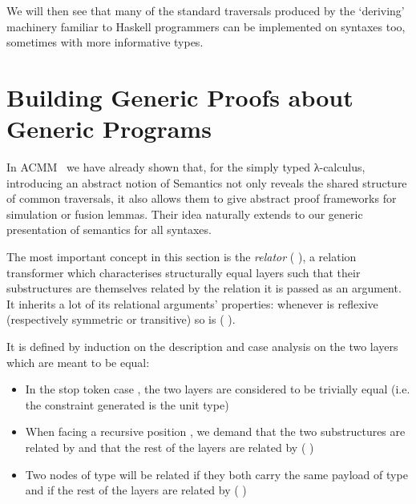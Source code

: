 We will then see that many of the standard traversals produced by the
`deriving' machinery familiar to Haskell programmers can be implemented
on syntaxes too, sometimes with more informative types.





\section{Building Generic Proofs about Generic Programs}

In ACMM~\citeyear{allais2017type} we have
already shown that, for the simply typed λ-calculus, introducing an abstract
notion of Semantics not only reveals the shared structure of common
traversals, it also allows them to give abstract proof frameworks for
simulation or fusion lemmas. Their idea naturally extends to our generic
presentation of semantics for all syntaxes.

The most important concept in this section is the \emph{relator} (  ),
a relation transformer which characterises structurally equal layers such that their
substructures are themselves related by the relation it is passed as an
argument. It inherits a lot of its relational arguments' properties: whenever
 is reflexive (respectively symmetric or transitive) so is {(   )}.\label{lem:zipstable}

It is defined by induction on the description and case analysis on the two
layers which are meant to be equal:
\begin{itemize}
  \item In the stop token case  , the two layers are considered to
    be trivially equal (i.e. the constraint generated is the unit type)
  \item When facing a recursive position { \AB{$\Delta$}  }, we
    demand that the two substructures are related by { \AB{$\Delta$} }
    and that the rest of the layers are related by (   )
  \item Two nodes of type {  } will
    be related if they both carry the same payload  of type  and if
    the rest of the layers are related by (    )
\end{itemize}

